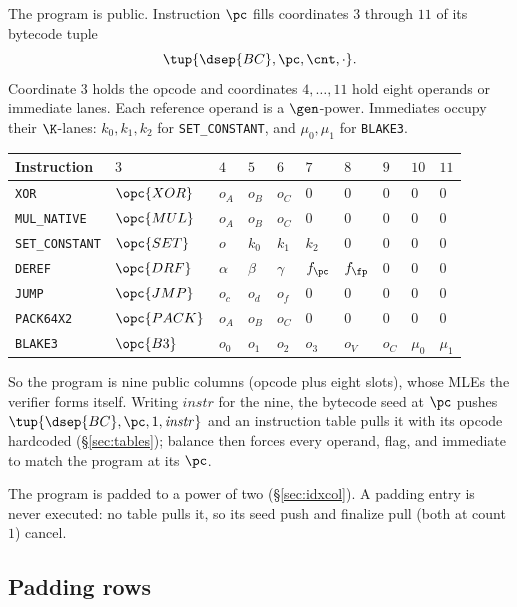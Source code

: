 The program is public. Instruction $\pc$ fills coordinates $3$ through $11$ of its bytecode tuple
\[
  \tup{\dsep{BC},\pc,\cnt,\cdot}.
\]
Coordinate $3$ holds the opcode and coordinates $4,\ldots,11$ hold eight operands or immediate lanes. Each reference operand is a $\gen$-power. Immediates occupy their $\K$-lanes: $k_0,k_1,k_2$ for \texttt{SET\_CONSTANT}, and $\mu_0,\mu_1$ for \texttt{BLAKE3}.
\begin{center}
\begin{tabular}{llllllllll}
\hline
Instruction & $3$ & $4$ & $5$ & $6$ & $7$ & $8$ & $9$ & $10$ & $11$\\
\hline
\texttt{XOR}           & $\opc{XOR}$ & $o_A$ & $o_B$ & $o_C$ & $0$ & $0$ & $0$ & $0$ & $0$\\
\texttt{MUL\_NATIVE}   & $\opc{MUL}$ & $o_A$ & $o_B$ & $o_C$ & $0$ & $0$ & $0$ & $0$ & $0$\\
\texttt{SET\_CONSTANT} & $\opc{SET}$ & $o$   & $k_0$ & $k_1$ & $k_2$ & $0$ & $0$ & $0$ & $0$\\
\texttt{DEREF}         & $\opc{DRF}$ & $\alpha$ & $\beta$ & $\gamma$ & $f_{\pc}$ & $f_{\fp}$ & $0$ & $0$ & $0$\\
\texttt{JUMP}          & $\opc{JMP}$ & $o_c$ & $o_d$ & $o_f$ & $0$ & $0$ & $0$ & $0$ & $0$\\
\texttt{PACK64X2}      & $\opc{PACK}$ & $o_A$ & $o_B$ & $o_C$ & $0$ & $0$ & $0$ & $0$ & $0$\\
\texttt{BLAKE3}        & $\opc{B3}$  & $o_0$ & $o_1$ & $o_2$ & $o_3$ & $o_V$ & $o_C$ & $\mu_0$ & $\mu_1$\\
\hline
\end{tabular}
\end{center}
So the program is nine public columns (opcode plus eight slots), whose MLEs the verifier forms itself. Writing $\mathit{instr}$ for the nine, the bytecode seed at $\pc$ pushes $\tup{\dsep{BC},\pc,1,\mathit{instr}}$ and an instruction table pulls it with its opcode hardcoded (\S\ref{sec:tables}); balance then forces every operand, flag, and immediate to match the program at its $\pc$.

The program is padded to a power of two (\S\ref{sec:idxcol}). A padding entry is never executed: no table pulls it, so its seed push and finalize pull (both at count $1$) cancel.

\subsection{Padding rows}\label{sec:e2e-pad}

